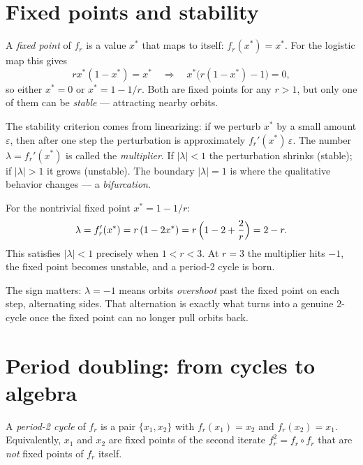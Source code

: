 \documentclass[11pt]{article}
\begin{document}
\section{Fixed points and stability}
\label{sec:fixed}

A \emph{fixed point} of $f_r$ is a value $x^*$ that maps to itself:
$f_r(x^*)=x^*$.  For the logistic map this gives
\[
rx^*(1-x^*) = x^* \quad\Longrightarrow\quad x^*\bigl(r(1-x^*)-1\bigr)=0,
\]
so either $x^*=0$ or $x^*=1-1/r$.  Both are fixed points for any $r>1$, but
only one of them can be \emph{stable} --- attracting nearby orbits.

The stability criterion comes from linearizing: if we perturb $x^*$ by a small
amount $\varepsilon$, then after one step the perturbation is approximately
$f_r'(x^*)\,\varepsilon$.  The number $\lambda = f_r'(x^*)$ is called the
\emph{multiplier}.  If $|\lambda|<1$ the perturbation shrinks (stable); if
$|\lambda|>1$ it grows (unstable).  The boundary $|\lambda|=1$ is where the
qualitative behavior changes --- a \emph{bifurcation}.

For the nontrivial fixed point $x^*=1-1/r$:
\begin{equation}
\label{eq:mult1}
\lambda = f_r'(x^*) = r\,(1-2x^*) = r\,\Bigl(1-2+\frac{2}{r}\Bigr) = 2-r.
\end{equation}
This satisfies $|\lambda|<1$ precisely when $1<r<3$.  At $r=3$ the multiplier
hits $-1$, the fixed point becomes unstable, and a period-2 cycle is born.

The sign matters: $\lambda=-1$ means orbits \emph{overshoot} past the fixed
point on each step, alternating sides.  That alternation is exactly what turns
into a genuine 2-cycle once the fixed point can no longer pull orbits back.

\section{Period doubling: from cycles to algebra}
\label{sec:doubling}

A \emph{period-2 cycle} of $f_r$ is a pair $\{x_1,x_2\}$ with $f_r(x_1)=x_2$
and $f_r(x_2)=x_1$.  Equivalently, $x_1$ and $x_2$ are fixed points of the
second iterate $f_r^2=f_r\circ f_r$ that are \emph{not} fixed points of $f_r$
itself.
\end{document}

